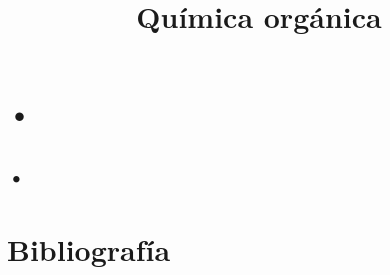 \documentclass{{../slide}}
\title{Química orgánica}
\institute{Universidad Politécnica de Sinaloa}
\begin{document}
\Portada
\Indice


    \section{•}

\subsection{•}



\section{Bibliografía}

\begin{frame}
    
\end{frame}
\end{document}
